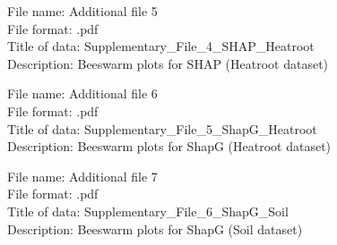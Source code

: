 \documentclass[12pt]{article}
\theoremstyle{thmstyleone}%
\theoremstyle{thmstyletwo}%
\theoremstyle{thmstylethree}%
\begin{document}
\begin{flushleft}
File name: Additional file 5 \\
File format: .pdf \\
Title of data: Supplementary\_File\_4\_SHAP\_Heatroot \\
Description: Beeswarm plots for SHAP (Heatroot dataset)
\end{flushleft}

\begin{flushleft}
File name: Additional file 6 \\
File format: .pdf \\
Title of data: Supplementary\_File\_5\_ShapG\_Heatroot \\
Description: Beeswarm plots for ShapG (Heatroot dataset)
\end{flushleft}

\begin{flushleft}
File name: Additional file 7 \\
File format: .pdf \\
Title of data: Supplementary\_File\_6\_ShapG\_Soil \\
Description: Beeswarm plots for ShapG (Soil dataset)
\end{flushleft}




% 
\end{document}
